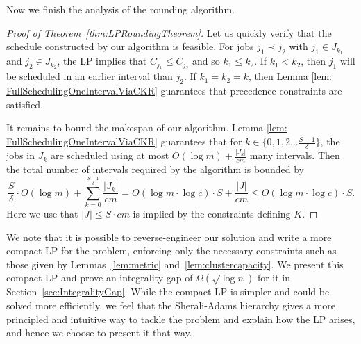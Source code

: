 Now we finish the analysis of the rounding algorithm.
\begin{proof}[Proof of Theorem~\ref{thm:LPRoundingTheorem}]
  Let us quickly verify that the schedule constructed by our algorithm is feasible.
 For jobs $j_1 \prec j_2$ with $j_1 \in J_{k_1}$ and $j_2 \in J_{k_2}$, the LP implies that $C_{j_1} \leq C_{j_2}$
 and so $k_1 \leq k_2$. If $k_1<k_2$, then $j_1$ will be scheduled in an earlier interval than $j_2$.
 If $k_1=k_2=k$, then 
 Lemma \ref{lem: FullSchedulingOneIntervalViaCKR}  guarantees that precedence  constraints are satisfied.

It remains to bound the makespan of our algorithm.  
Lemma \ref{lem: FullSchedulingOneIntervalViaCKR} guarantees that for $k \in \{0,1,2 \ldots \frac{S-1}{\delta}\}$, the jobs in $J_k$ are scheduled using at most $O(\log m) + \frac{|J_k|}{cm}$ many intervals. %
Then the total number of intervals required by the algorithm is bounded by
$$
\frac{S}{\delta} \cdot O(\log m)  + \sum^{\frac{S-1}{\delta}}_{k = 0} \frac{|J_k|}{cm} =O(\log m \cdot \log c)  \cdot S  +  \frac{|J|}{cm}\leq O(\log m \cdot \log c) \cdot S.
$$
Here we use that $|J| \leq S \cdot cm$ is implied by the constraints defining $K$.
\end{proof}

\begin{remark}
We note that
it is possible to reverse-engineer our solution and write a more compact LP for the problem, enforcing only the necessary constraints such as those given by Lemmas~\ref{lem:metric} and~\ref{lem:clustercapacity}.
We present this compact LP and prove an integrality gap of $\Omega(\sqrt{\log n})$ for it in Section~\ref{sec:IntegralityGap}.
While the compact LP is simpler and could be solved more efficiently,
 we feel that the Sherali-Adams hierarchy gives a more principled and intuitive way to tackle the problem and explain how the LP arises, and hence we choose to present it that way.
\end{remark}

